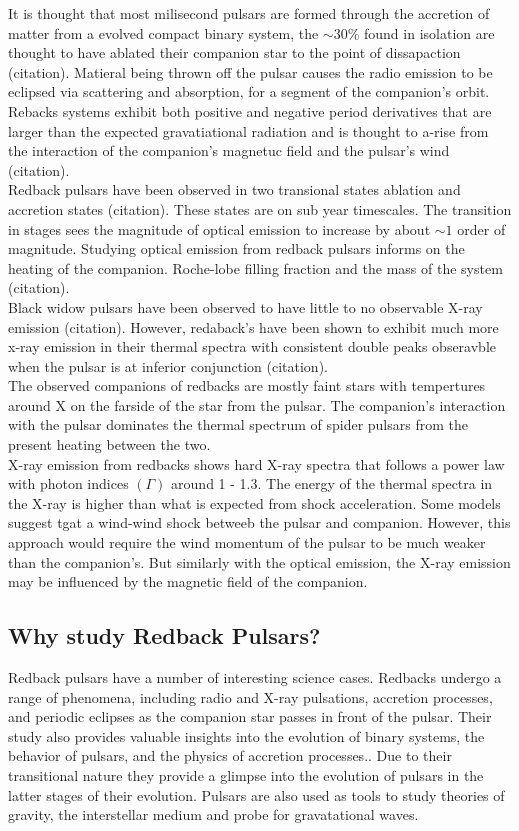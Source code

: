 It is thought that most milisecond pulsars are formed through the accretion of matter from a evolved compact binary system, the $\sim 30\%$ found in isolation are thought to have ablated their companion star to the point of dissapaction (citation). Matieral being thrown off the pulsar causes the radio emission to be eclipsed via scattering and absorption, for a segment of the companion's orbit. Rebacks systems exhibit both positive and negative period derivatives that are larger than the expected gravatiational radiation and is thought to a-rise from the interaction of the companion's magnetuc field and the pulsar's wind (citation). \\
Redback pulsars have been observed in two transional states ablation and accretion states (citation). These states are on sub year timescales. The transition in stages sees the magnitude of optical emission to increase by about $\sim 1$ order of magnitude. Studying optical emission from redback pulsars informs on the heating of the companion. Roche-lobe filling fraction and the mass of the system (citation). \\ Black widow pulsars have been observed to have little to no observable X-ray emission (citation). However, redaback's have been shown to exhibit much more x-ray emission in their thermal spectra with consistent double peaks obseravble when the pulsar is at inferior conjunction (citation). \\
The observed companions of redbacks are mostly faint stars with tempertures around X on the farside of the star from the pulsar. The companion's interaction with the pulsar dominates the thermal spectrum of spider pulsars from the present heating between the two. \\
X-ray emission from redbacks shows hard X-ray spectra that follows a power law with photon indices $(\Gamma)$ around 1 - 1.3. The energy of the thermal spectra in the X-ray is higher than what is expected from shock acceleration. Some models suggest tgat a wind-wind shock betweeb the pulsar and companion. However, this approach would require the wind momentum of the pulsar to be much weaker than the companion's. But similarly with the optical emission, the X-ray emission may be influenced by the magnetic field of the companion.  

\subsection{Why study Redback Pulsars?}

Redback pulsars have a number of interesting science cases. Redbacks undergo a range of phenomena, including radio and X-ray pulsations, accretion processes, and periodic eclipses as the companion star passes in front of the pulsar. Their study also provides valuable insights into the evolution of binary systems, the behavior of pulsars, and the physics of accretion processes.. Due to their transitional nature they provide a glimpse into the evolution of pulsars in the latter stages of their evolution. Pulsars are also used as tools to study theories of gravity, the interstellar medium and probe for gravatational waves. 

